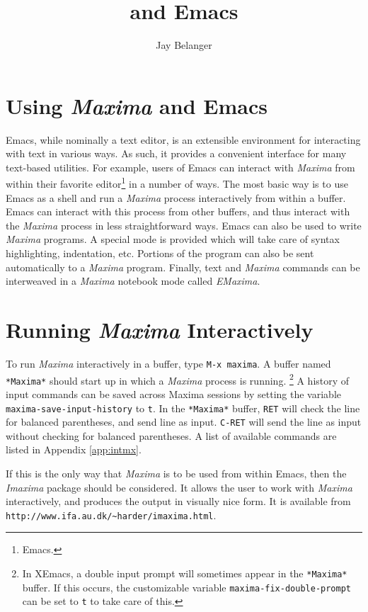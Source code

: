 \documentclass{article}
\title{\mx{} and Emacs}
\author{Jay Belanger}
\date{}
\newcommand{\emx}{\textsl{\sffamily EMaxima}}
\newcommand{\mx}{\textsl{\sffamily Maxima}}
\newcommand{\hyph}{-\hspace{0pt}}
\begin{document}
\maketitle

\section{Using \mx{} and Emacs}

Emacs, while nominally a text editor, is an extensible environment for
interacting with text in various ways.  As such, it provides a
convenient interface for many text-based utilities.  For example,
users of Emacs can interact with \mx{} from within their favorite
editor\footnote{Emacs.} in a number of ways.  The most basic way is to
use Emacs as a shell and run a \mx{} process interactively from
within a buffer.  Emacs can interact with this process from other
buffers, and thus interact with the \mx{} process in less
straightforward ways.  Emacs can also be used to write
\mx{} programs.  A special mode is provided which will take
care of syntax highlighting, indentation, etc.  Portions of the
program can also be sent automatically to a \mx{} program.
Finally, text and \mx{} commands can be interweaved in a \mx{}
notebook mode called \emx{}.

\section{Running \mx{} Interactively}

To run \mx{} interactively in a buffer, type \texttt{M-x maxima}.  A
buffer named \texttt{*Maxima*} should start up in which a \mx{}
process is running.%
\footnote{In XEmacs, a double input prompt will sometimes appear in
  the \texttt{*Maxima*} buffer.  If this occurs, the customizable
  variable \texttt{maxima\hyph{}fix\hyph{}double\hyph{}prompt} can be set to \texttt{t}
  to take care of this.}
A history of input commands can be saved across Maxima sessions by
setting the variable \texttt{maxima\hyph{}save\hyph{}input\hyph{}history} to \texttt{t}.
In the \texttt{*Maxima*} buffer, \texttt{RET} will check the line for
balanced parentheses, and send line as input.  \texttt{C-RET} will
send the line as input without checking for balanced parentheses.  A
list of available commands are listed in Appendix \ref{app:intmx}.

If this is the only way that \mx{} is to be used from within Emacs,
then the \textsl{Imaxima} package should be considered.  It allows the
user to work with \mx{} interactively, and produces the output in
visually nice form.  It is available from
\verb+http://www.ifa.au.dk/~harder/imaxima.html+.
\end{document}
